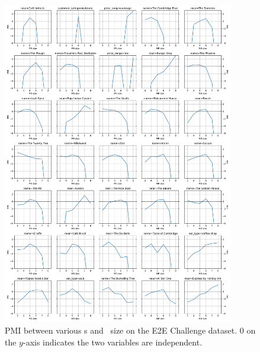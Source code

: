 
\begin{figure}[p]
\centering
    \includegraphics[width=0.9\textwidth]{nlg/trainpmis.pdf}
\caption{PMI between various \attributevalue s and \meaningrepresentation~size
on the E2E Challenge dataset. 0 on the $y$-axis indicates the two variables are independent.}
\label{fig:trainpmi}
\end{figure}
